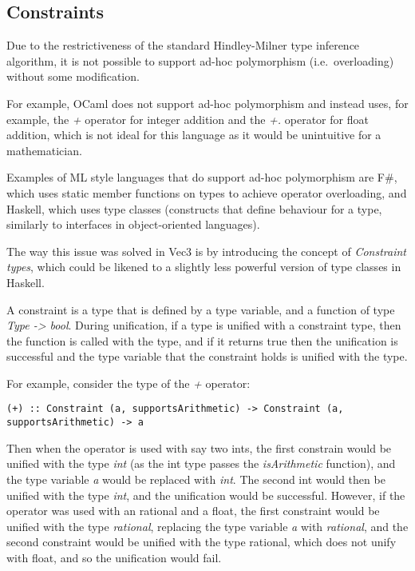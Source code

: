 \subsection{Constraints}\label{subsec:constraints}

Due to the restrictiveness of the standard Hindley-Milner type inference algorithm, it is not possible to support ad-hoc
polymorphism (i.e.\ overloading) without some modification.

For example, OCaml\citep{ocamlDocs} does not support ad-hoc polymorphism and instead uses, for example, the \textit{+}
operator for integer addition and the \textit{+.} operator for float addition, which is not ideal for this language 
as it would be unintuitive for a mathematician.

Examples of ML style languages that do support ad-hoc polymorphism are F\#, which uses static member functions on 
types to achieve operator overloading\citep{fsharpdocs}, and Haskell, which uses type classes
\citep{haskellDocs} (constructs that define behaviour for a type, similarly to interfaces in object-oriented languages).

The way this issue was solved in Vec3 is by introducing the concept of \textit{Constraint types}, which could be 
likened to a slightly less powerful version of type classes in Haskell.

A constraint is a type that is defined by a type variable, and a function of type \textit{Type -> bool}.
During unification, if a type is unified with a constraint type, then the function is called with the type, and if it
returns true then the unification is successful and the type variable that the constraint holds is unified with the
type.

For example, consider the type of the \textit{+} operator:

\begin{verbatim}
(+) :: Constraint (a, supportsArithmetic) -> Constraint (a, supportsArithmetic) -> a
\end{verbatim}

Then when the operator is used with say two ints, the first constrain would be unified with the type 
\textit{int} (as the int type passes the \textit{isArithmetic} function), and the type variable \textit{a} would be 
replaced with \textit{int}.
The second int would then be unified with the type \textit{int}, and the unification would be successful.
However, if the operator was used with an rational and a float, the first constraint would be unified with the type
\textit{rational}, replacing the type variable \textit{a} with \textit{rational}, and the second constraint would be 
unified 
with the type rational, which does not unify with float, and so the unification would fail.

